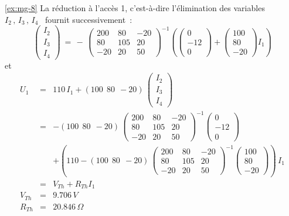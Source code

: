 \begin{solexercise}{\ref{ex:mg-8}}
La réduction à l'accès 1, c'est-à-dire l'élimination des variables \
$I_2\, ,\, I_3\, ,\, I_4$ \ fournit successivement~:
\[ \left(  \begin{array}{c} I_2 \\ I_3 \\ I_4 \end{array} \right)
\: = \, - \, 
\left( \begin{array}{rrr} 
200 & 80 & -20 \\
80 & 105 & 20\\
-20 & 20 & 50
\end{array} \right)^{-1}
\left( \left( \begin{array}{c} 0 \\ -12 \\ 0 \end{array} \right)
+ \left( \begin{array}{r} 100 \\ 80 \\ -20 \end{array} \right)
I_1 \right) \]
et
\begin{eqnarray*}
	U_1 &=&  110\, I_1 + \left( 100~~80~~-20 \right) \, 
	\left( \begin{array}{c} I_2 \\ I_3 \\ I_4 \end{array} \right)\\
	&=& -\left( 100~~80~~-20 \right) \, 
	\left( \begin{array}{rrr} 
		200 & 80 & -20\\
		80 & 105 & 20\\
		-20 & 20 & 50 
	\end{array} \right)^{-1}
	\left( \begin{array}{c} 0 \\ -12 \\ 0 \end{array} \right)\\
	&& + \left( 110 - \left( 100~~80~~-20 \right) \, 
	\left( \begin{array}{rrr}
		200 & 80 & -20\\
		80 & 105 & 20\\
		-20 & 20 & 50
	\end{array} \right) ^{-1}
	\left( \begin{array}{r} 100\\ 80\\ -20 \end{array} \right) 
	\right) \, I_1\\
	&=& V_{Th} + R_{Th} I_1\\
	V_{Th} &=& 9.706\, V\\
	R_{Th} &=& 20.846\, \Omega
\end{eqnarray*}


\end{solexercise}
